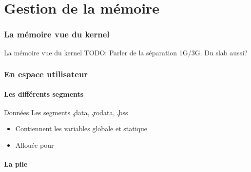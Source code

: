 %
%
%

\part{Gestion de la mémoire}


\begin{frame}
  \partpage
\end{frame}

\begin{frame}
  \tableofcontents[currentpart]
\end{frame}

\section{La mémoire vue du kernel }

\begin{frame}[fragile=singleslide]{La mémoire vue du kernel}
  TODO: Parler de la séparation 1G/3G. Du slab aussi?
\end{frame} 

\section{En espace utilisateur}

\subsection{Les différents segments}

\begin{frame}[fragile=singleslide]{Données}
  Les segments \c{.data}, \c{.rodata}, \c{.bss}
  \begin{itemize}
  \item Contiennent les variables globale et statique
  \item Allouée pour 
  \end{itemize}
\end{frame}

\subsection{La pile}

